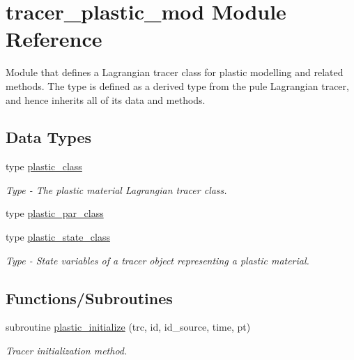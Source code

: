\hypertarget{namespacetracer__plastic__mod}{}\section{tracer\+\_\+plastic\+\_\+mod Module Reference}
\label{namespacetracer__plastic__mod}


Module that defines a Lagrangian tracer class for plastic modelling and related methods. The type is defined as a derived type from the pule Lagrangian tracer, and hence inherits all of it\textquotesingle{}s data and methods.  


\subsection*{Data Types}
\begin{DoxyCompactItemize}
\item 
type \mbox{\hyperlink{structtracer__plastic__mod_1_1plastic__class}{plastic\+\_\+class}}
\begin{DoxyCompactList}\small\item\em Type -\/ The plastic material Lagrangian tracer class. \end{DoxyCompactList}\item 
type \mbox{\hyperlink{structtracer__plastic__mod_1_1plastic__par__class}{plastic\+\_\+par\+\_\+class}}
\item 
type \mbox{\hyperlink{structtracer__plastic__mod_1_1plastic__state__class}{plastic\+\_\+state\+\_\+class}}
\begin{DoxyCompactList}\small\item\em Type -\/ State variables of a tracer object representing a plastic material. \end{DoxyCompactList}\end{DoxyCompactItemize}
\subsection*{Functions/\+Subroutines}
\begin{DoxyCompactItemize}
\item 
subroutine \mbox{\hyperlink{namespacetracer__plastic__mod_a42882cd86cfe30f341d8150582a664a9}{plastic\+\_\+initialize}} (trc, id, id\+\_\+source, time, pt)
\begin{DoxyCompactList}\small\item\em Tracer initialization method. \end{DoxyCompactList}\end{DoxyCompactItemize}


